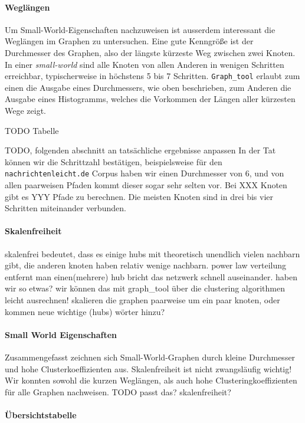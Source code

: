 \documentclass[12pt, a4paper]{article}
\begin{document}
\paragraph{Wegl\"angen}
Um Small-World-Eigenschaften nachzuweisen ist ausserdem interessant die
Weglängen im Graphen zu untersuchen. Eine gute Kenngröße ist der Durchmesser
des Graphen, also der längste kürzeste Weg zwischen zwei Knoten. In einer
\emph{small-world} sind alle Knoten von allen Anderen in wenigen Schritten
erreichbar, typischerweise in höchstens 5 bis 7 Schritten. \texttt{Graph\_tool}
erlaubt zum einen die Ausgabe eines Durchmessers, wie oben beschrieben, zum
Anderen die Ausgabe eines Histogramms, welches die Vorkommen der Längen aller
kürzesten Wege zeigt.

TODO Tabelle

TODO, folgenden abschnitt an tatsächliche ergebnisse anpassen In der Tat können
wir die Schrittzahl bestätigen, beispielsweise für den
\texttt{nachrichtenleicht.de} Corpus haben wir einen Durchmesser von 6, und von
allen paarweisen Pfaden kommt dieser sogar sehr selten vor. Bei XXX Knoten gibt
es YYY Pfade zu berechnen. Die meisten Knoten sind in drei bis vier Schritten
miteinander verbunden.

                             
\paragraph{Skalenfreiheit}
skalenfrei bedeutet, dass es einige hubs mit theoretisch unendlich vielen
nachbarn gibt, die anderen knoten haben relativ wenige nachbarn. power law
verteilung entfernt man einen(mehrere) hub bricht das netzwerk schnell
auseinander. haben wir so etwas? wir können das mit graph\_tool über die
clustering algorithmen leicht ausrechnen!  skalieren die graphen paarweise um
ein paar knoten, oder kommen neue wichtige (hubs) wörter hinzu?

\paragraph{Small World Eigenschaften}
Zusammengefasst zeichnen sich Small-World-Graphen durch kleine Durchmesser und
hohe Clusterkoeffizienten aus. Skalenfreiheit ist nicht zwangsläufig wichtig!
Wir konnten sowohl die kurzen Weglängen, als auch hohe Clusteringkoeffizienten
für alle Graphen nachweisen. TODO passt das? skalenfreiheit? 


\paragraph{Übersichtstabelle}
\end{document}
